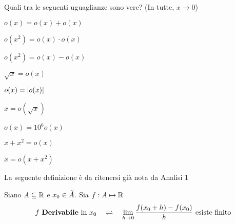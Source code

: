 \begin{exercise}
	Quali tra le seguenti uguaglianze sono vere? (In tutte, $x \to 0$)
	\begin{itemize}
		\begin{minipage}{0.33\linewidth}
			\item $o(x) = o(x) + o(x)$
			\item $o(x^2) = o(x) \cdot o(x)$
			\item $o(x^2) = o(x) - o(x)$
		\end{minipage}
		\begin{minipage}{0.33\linewidth}
			\item $\sqrt{x} = o(x)$
			\item $o(x) = \left|o(x)\right|$
			\item $x = o(\sqrt{x})$
		\end{minipage}
		\begin{minipage}{0.33\linewidth}
			\item $o(x) = 10^6 o(x)$
			\item $x + x^2 = o(x)$
			\item $x = o(x + x^2)$
		\end{minipage}
	\end{itemize}
\end{exercise}
\vspace*{\baselineskip}
La seguente definizione è da ritenersi già nota da Analisi 1
\begin{definition}[Derivata in $\R$]
	Siano $A \subseteq \mathbb{R}$ e $x_0 \in \accentset{\circ}{A}$. Sia $f: A \mapsto \mathbb{R}$
	\[f \text{ \textbf{Derivabile} in } x_0 \quad \rightleftharpoons \quad \lim\limits_{h \to 0} \frac{f(x_0 + h) - f(x_0)}{h} \text{  esiste finito}\]
\end{definition}

